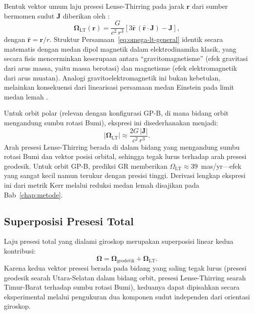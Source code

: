 Bentuk vektor umum laju presesi Lense-Thirring pada jarak $\mathbf{r}$ dari sumber bermomen sudut $\mathbf{J}$ diberikan oleh \parencite{Lense1918LenseThirring}:
\begin{equation}
    \bm{\Omega}_{\text{LT}}(\mathbf{r})
    = \frac{G}{c^2\, r^3}\left[3\hat{\mathbf{r}}\,(\hat{\mathbf{r}} \cdot \mathbf{J}) - \mathbf{J}\right],
    \label{eq:omega-lt-general}
\end{equation}
dengan $\hat{\mathbf{r}} = \mathbf{r}/r$. Struktur Persamaan~\eqref{eq:omega-lt-general} identik secara matematis dengan medan dipol magnetik dalam elektrodinamika klasik, yang secara fisis mencerminkan keserupaan antara ``gravitomagnetisme'' (efek gravitasi dari arus massa, yaitu massa berotasi) dan magnetisme (efek elektromagnetik dari arus muatan). Analogi gravitoelektromagnetik ini bukan kebetulan, melainkan konsekuensi dari linearisasi persamaan medan Einstein pada limit medan lemah \parencite{Misner1973Gravitation}.

Untuk orbit polar (relevan dengan konfigurasi GP-B, di mana bidang orbit mengandung sumbu rotasi Bumi), ekspresi ini disederhanakan menjadi:
\begin{equation}
    |\bm{\Omega}_{\text{LT}}| \approx \frac{2G\,|\mathbf{J}|}{c^2\, r^3}.
    \label{eq:omega-lt-approx}
\end{equation}
Arah presesi Lense-Thirring berada di dalam bidang yang mengandung sumbu rotasi Bumi dan vektor posisi orbital, sehingga tegak lurus terhadap arah presesi geodesik. Untuk orbit GP-B, prediksi GR memberikan $\Omega_{\text{LT}} \approx 39$~mas/yr---efek yang sangat kecil namun terukur dengan presisi tinggi. Derivasi lengkap ekspresi ini dari metrik Kerr melalui reduksi medan lemah disajikan pada Bab~\ref{chap:metode}.

\subsection{Superposisi Presesi Total}
\label{subsec:presesi-total}

Laju presesi total yang dialami giroskop merupakan superposisi linear kedua kontribusi:
\begin{equation}
    \bm{\Omega} = \bm{\Omega}_{\text{geodetik}} + \bm{\Omega}_{\text{LT}}.
    \label{eq:omega-total}
\end{equation}
Karena kedua vektor presesi berada pada bidang yang saling tegak lurus (presesi geodesik searah Utara-Selatan dalam bidang orbit, presesi Lense-Thirring searah Timur-Barat terhadap sumbu rotasi Bumi), keduanya dapat dipisahkan secara eksperimental melalui pengukuran dua komponen sudut independen dari orientasi giroskop.


